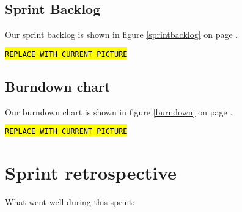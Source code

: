 \documentclass[a4paper,11pt]{article}
\begin{document}
\subsection{Sprint Backlog}
Our sprint backlog is shown in figure \ref{sprintbacklog} on page \pageref{sprintbacklog}.

{ %
\texttt{\hl{REPLACE WITH CURRENT PICTURE}}
}


\subsection{Burndown chart}

Our burndown chart is shown in figure \ref{burndown} on page \pageref{burndown}.

{ %
\texttt{\hl{REPLACE WITH CURRENT PICTURE}\\}
}


%
%

\clearpage

\section{Sprint retrospective}

What went well during this sprint:
\end{document}
